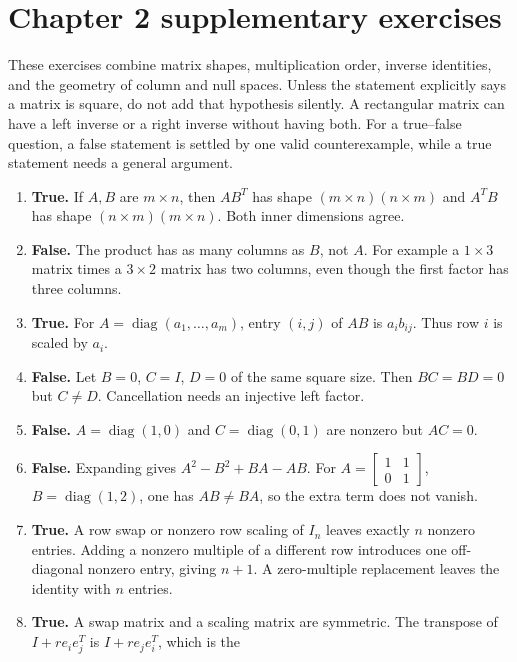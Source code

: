 \section{Chapter 2 supplementary exercises}
These exercises combine matrix shapes, multiplication order, inverse identities,
and the geometry of column and null spaces. Unless the statement explicitly
says a matrix is square, do not add that hypothesis silently. A rectangular
matrix can have a left inverse or a right inverse without having both.
For a true--false question, a false statement is settled by one valid
counterexample, while a true statement needs a general argument.

\begin{enumerate}[label=(\alph*)]
\item \textbf{True.} If $A,B$ are $m\times n$, then $AB^T$ has
shape $(m\times n)(n\times m)$ and $A^TB$ has shape
$(n\times m)(m\times n)$. Both inner dimensions agree.
\item \textbf{False.} The product has as many columns as $B$, not $A$.
For example a $1\times3$ matrix times a $3\times2$ matrix has two columns,
even though the first factor has three columns.
\item \textbf{True.} For $A=\operatorname{diag}(a_1,\ldots,a_m)$,
entry $(i,j)$ of $AB$ is $a_i b_{ij}$. Thus row $i$ is scaled by $a_i$.
\item \textbf{False.} Let $B=0$, $C=I$, $D=0$ of the same square size.
Then $BC=BD=0$ but $C\ne D$. Cancellation needs an injective left factor.
\item \textbf{False.} $A=\operatorname{diag}(1,0)$ and
$C=\operatorname{diag}(0,1)$ are nonzero but $AC=0$.
\item \textbf{False.} Expanding gives $A^2-B^2+BA-AB$.
For $A=\begin{bmatrix}1&1\\0&1\end{bmatrix}$,
$B=\operatorname{diag}(1,2)$, one has $AB\ne BA$, so the extra term does not vanish.
\item \textbf{True.} A row swap or nonzero row scaling of $I_n$
leaves exactly $n$ nonzero entries. Adding a nonzero multiple of a different
row introduces one off-diagonal nonzero entry, giving $n+1$.
A zero-multiple replacement leaves the identity with $n$ entries.
\item \textbf{True.} A swap matrix and a scaling matrix are symmetric.
The transpose of $I+r e_i e_j^T$ is $I+r e_j e_i^T$, which is the

\end{enumerate}
